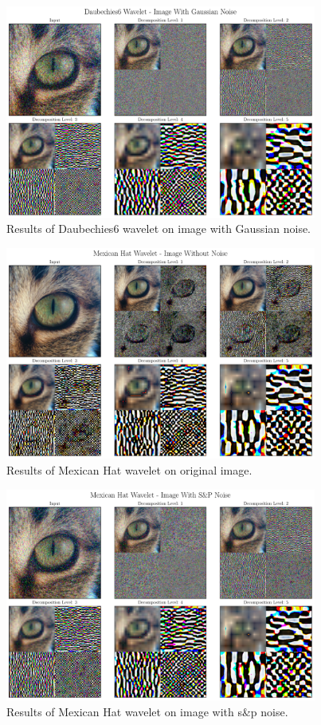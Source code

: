 \documentclass[12pt]{article}
\begin{document}
	\begin{figure}[!h]
		\centering
		\includegraphics[height=7cm]{../Tests/Outputs/2D_Daubechies6Wavelet_GaussianNoise.pdf}
		\caption{Results of Daubechies6 wavelet on image with Gaussian noise.}
		\label{fig:2d_db6_gs}
	\end{figure}
	
	\begin{figure}[!h]
		\centering
		\includegraphics[height=7cm]{../Tests/Outputs/2D_MexicanHatWavelet_WithoutNoise.pdf}
		\caption{Results of Mexican Hat wavelet on original image.}
		\label{fig:2d_mh}
	\end{figure}
	
	\begin{figure}[!h]
		\centering
		\includegraphics[height=7cm]{../Tests/Outputs/2D_MexicanHatWavelet_SPNoise.pdf}
		\caption{Results of Mexican Hat wavelet on image with s\&p noise.}
		\label{fig:2d_mh_sp}
	\end{figure}
	
\end{document}
